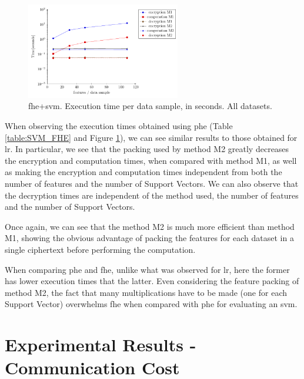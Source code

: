 \begin{figure}[hpt]
\centering
\includegraphics[width=0.60\textwidth]{images/graphs/svm_fhe.pdf}
\caption{\acs{fhe}+\acs{svm}. Execution time per data sample, in seconds. All datasets.}
\label{fig:svm-fhe}
\end{figure}

When observing the execution times obtained using \ac{phe} (Table \ref{table:SVM_FHE} and Figure \ref{fig:svm-fhe}), we can see similar results to those obtained for \ac{lr}. In particular, we see that the packing used by method M2 greatly decreases the encryption and computation times, when compared with method M1, as well as making the encryption and computation times independent from both the number of features and the number of Support Vectors. 
We can also observe that the decryption times are independent of the method used, the number of features and the number of Support Vectors.

Once again, we can see that the method M2 is much more efficient than method M1, showing the obvious advantage of packing the features for each dataset in a single ciphertext before performing the computation.

When comparing \ac{phe} and \ac{fhe}, unlike what was observed for \ac{lr}, here the former has lower execution times that the latter. Even considering the feature packing of method M2, the fact that many multiplications have to be made (one for each Support Vector) overwhelms \ac{fhe} when compared with \ac{phe} for evaluating an \ac{svm}.


\section{Experimental Results - Communication Cost}
\label{sec:CommunicationCosts}

